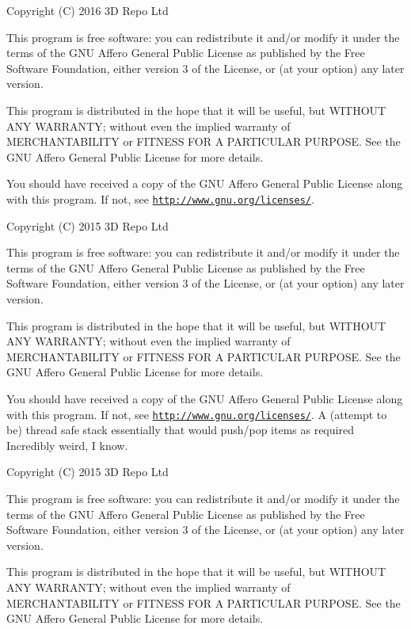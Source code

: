 Copyright (C) 2016 3\+D Repo Ltd

This program is free software\+: you can redistribute it and/or modify it under the terms of the G\+N\+U Affero General Public License as published by the Free Software Foundation, either version 3 of the License, or (at your option) any later version.

This program is distributed in the hope that it will be useful, but W\+I\+T\+H\+O\+U\+T A\+N\+Y W\+A\+R\+R\+A\+N\+T\+Y; without even the implied warranty of M\+E\+R\+C\+H\+A\+N\+T\+A\+B\+I\+L\+I\+T\+Y or F\+I\+T\+N\+E\+S\+S F\+O\+R A P\+A\+R\+T\+I\+C\+U\+L\+A\+R P\+U\+R\+P\+O\+S\+E. See the G\+N\+U Affero General Public License for more details.

You should have received a copy of the G\+N\+U Affero General Public License along with this program. If not, see \href{http://www.gnu.org/licenses/}{\tt http\+://www.\+gnu.\+org/licenses/}.

Copyright (C) 2015 3\+D Repo Ltd

This program is free software\+: you can redistribute it and/or modify it under the terms of the G\+N\+U Affero General Public License as published by the Free Software Foundation, either version 3 of the License, or (at your option) any later version.

This program is distributed in the hope that it will be useful, but W\+I\+T\+H\+O\+U\+T A\+N\+Y W\+A\+R\+R\+A\+N\+T\+Y; without even the implied warranty of M\+E\+R\+C\+H\+A\+N\+T\+A\+B\+I\+L\+I\+T\+Y or F\+I\+T\+N\+E\+S\+S F\+O\+R A P\+A\+R\+T\+I\+C\+U\+L\+A\+R P\+U\+R\+P\+O\+S\+E. See the G\+N\+U Affero General Public License for more details.

You should have received a copy of the G\+N\+U Affero General Public License along with this program. If not, see \href{http://www.gnu.org/licenses/}{\tt http\+://www.\+gnu.\+org/licenses/}. A (attempt to be) thread safe stack essentially that would push/pop items as required Incredibly weird, I know.

Copyright (C) 2015 3\+D Repo Ltd

This program is free software\+: you can redistribute it and/or modify it under the terms of the G\+N\+U Affero General Public License as published by the Free Software Foundation, either version 3 of the License, or (at your option) any later version.

This program is distributed in the hope that it will be useful, but W\+I\+T\+H\+O\+U\+T A\+N\+Y W\+A\+R\+R\+A\+N\+T\+Y; without even the implied warranty of M\+E\+R\+C\+H\+A\+N\+T\+A\+B\+I\+L\+I\+T\+Y or F\+I\+T\+N\+E\+S\+S F\+O\+R A P\+A\+R\+T\+I\+C\+U\+L\+A\+R P\+U\+R\+P\+O\+S\+E. See the G\+N\+U Affero General Public License for more details.

